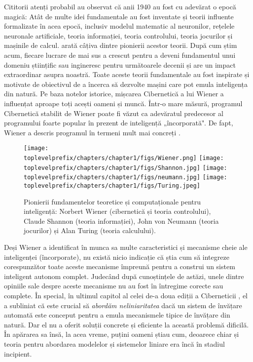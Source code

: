 \documentclass[../../book-main_ro.tex]{subfiles}
\begin{document}
Cititorii atenți probabil au observat că anii 1940 au fost cu adevărat o epocă magică: Atât de multe idei fundamentale au fost inventate și teorii influente formalizate în acea epocă, inclusiv modelul matematic al neuronilor, rețelele neuronale artificiale, teoria informației, teoria controlului, teoria jocurilor și mașinile de calcul.  arată câțiva dintre pionierii acestor teorii. După cum știm acum, fiecare lucrare de mai sus a crescut pentru a deveni fundamentul unui domeniu științific sau ingineresc pentru următoarele decenii și are un impact extraordinar asupra noastră. Toate aceste teorii fundamentale au fost inspirate și motivate de obiectivul de a încerca să dezvolte mașini care pot emula inteligența din natură. Pe baza notelor istorice, mișcarea Cibernetică a lui Wiener a influențat aproape toți acești oameni și muncă. Într-o mare măsură, programul Cibernetică stabilit de Wiener poate fi văzut ca adevăratul predecesor al programului foarte popular în prezent de inteligență „încorporată". De fapt, Wiener a descris programul în termeni mult mai concreți \cite{Wiener-Cybernetics-1961}.
\begin{figure}
    \centering
    \texttt{[image: \\toplevelprefix/chapters/chapter1/figs/Wiener.png]}
    \texttt{[image: \\toplevelprefix/chapters/chapter1/figs/Shannon.jpg]}
    \texttt{[image: \\toplevelprefix/chapters/chapter1/figs/neumann.jpg]}
    \texttt{[image: \\toplevelprefix/chapters/chapter1/figs/Turing.jpeg]}
    \caption{Pionierii fundamentelor teoretice și computaționale pentru inteligență: Norbert Wiener (cibernetică și teoria controlului), Claude Shannon (teoria informației), John von Neumann (teoria jocurilor) și Alan Turing (teoria calculului).}
    \label{fig:god-fathers}
\end{figure}

Deși Wiener a identificat în munca sa multe caracteristici și mecanisme cheie ale inteligenței (încorporate), nu există nicio indicație că știa cum să integreze corespunzător toate aceste mecanisme împreună pentru a construi un sistem inteligent autonom complet. Judecând după cunoștințele de astăzi, unele dintre opiniile sale despre aceste mecanisme nu au fost în întregime corecte sau complete. În special, în ultimul capitol al celei de-a doua ediții a Ciberneticii \cite{Wiener-Cybernetics-1961}, el a subliniat că este crucial să {\em abordăm neliniaritatea} dacă un sistem de învățare automată este conceput pentru a emula mecanismele tipice de învățare din natură. Dar el nu a oferit soluții concrete și eficiente la această problemă dificilă. În apărarea sa însă, la acea vreme, puțini oameni știau cum, deoarece chiar și teoria pentru abordarea modelelor și sistemelor liniare era încă în stadiul incipient.
\end{document}
